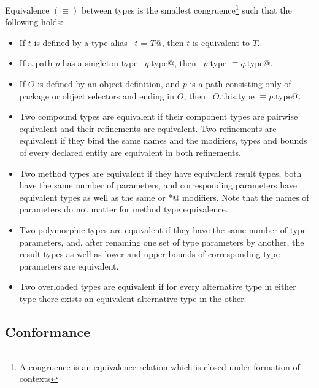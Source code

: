 \documentclass[a4paper,12pt,twoside,titlepage]{book}
\begin{document}
Equivalence $(\equiv)$ between types is the smallest congruence\footnote{ A
congruence is an equivalence relation which is closed under formation
of contexts} such that the following holds:
\begin{itemize}
\item 
If $t$ is defined by a type alias ~\lstinline@type $t$ = $T$@, then $t$ is
equivalent to $T$.
\item
If a path $p$ has a singleton type ~\lstinline@$q$.type@, then
~\lstinline@$p$.type $\equiv q$.type@.
\item
If $O$ is defined by an object definition, and $p$ is a path
consisting only of package or object selectors and ending in $O$, then
~\lstinline@$O$.this.type $\equiv p$.type@.
\item
Two compound types are equivalent if their component types are
pairwise equivalent and their refinements are equivalent. Two
refinements are equivalent if they bind the same names and the
modifiers, types and bounds of every declared entity are equivalent in
both refinements.
\item
Two method types are equivalent if they have equivalent result
types, both have the same number of parameters, and corresponding
parameters have equivalent types as well as the same  or
\lstinline@*@ modifiers.  Note that the names of parameters do not matter
for method type equivalence.
\item
Two polymorphic types are equivalent if they have the same number of
type parameters, and, after renaming one set of type parameters by
another, the result types as well as lower and upper bounds of
corresponding type parameters are equivalent.
\item
Two overloaded types are equivalent if for every alternative type in
either type there exists an equivalent alternative type in the other.
\end{itemize}

\subsection{Conformance}
\label{sec:subtyping}
\end{document}
